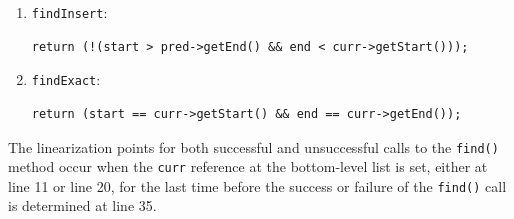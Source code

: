 \begin{enumerate}
    \item \texttt{findInsert}:
    \begin{lstlisting}[style=nonum, label={}]
 return (!(start > pred->getEnd() && end < curr->getStart()));
    \end{lstlisting}
    \item \texttt{findExact}:
    \begin{lstlisting}[style=nonum, label={}]
 return (start == curr->getStart() && end == curr->getEnd());
    \end{lstlisting}
\end{enumerate}

The linearization points for both successful and unsuccessful calls to the \texttt{find()} method occur when the \texttt{curr} reference at the bottom-level list is set, either at line 11 or line 20, for the last time before the success or failure of the \texttt{find()} call is determined at line 35.

